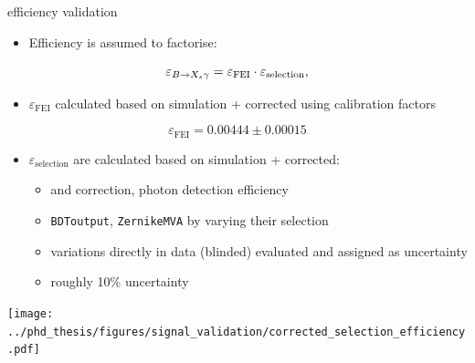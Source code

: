 \documentclass[xcolor=dvipsnames]{beamer}
\begin{document}
\begin{frame}{\BtoXsgamma efficiency validation}
\scriptsize\centering
\begin{itemize}
   \item Efficiency is assumed to factorise:
\end{itemize}
\begin{equation*}
   \varepsilon_{\BtoXsgamma} = \varepsilon_{\mathrm{FEI}} \cdot \varepsilon_{\mathrm{selection}},
\end{equation*}

\vspace{-5pt}

\begin{itemize}
   \item $\varepsilon_{\mathrm{FEI}}$ calculated based on simulation + corrected using calibration factors
\end{itemize}
\begin{equation*}
   \varepsilon_{\mathrm{FEI}} = 0.00444\pm0.00015
\end{equation*}

\vspace{-5pt}

\begin{itemize}
   \item $\varepsilon_{\mathrm{selection}}$ are calculated based on simulation + corrected:
   \begin{itemize}
      \scriptsize
      \item \piVeto and \etaVeto correction, photon detection efficiency 
      \vspace{5pt}
      \item \texttt{BDToutput}, \texttt{ZernikeMVA} by varying their selection 
      \item[\ra] variations directly in data (blinded) evaluated and assigned as uncertainty
      \item roughly 10\% uncertainty
   \end{itemize}
\end{itemize}
\texttt{[image: ../phd\_thesis/figures/signal\_validation/corrected\_selection\_efficiency.pdf]}


\end{frame}
\end{document}
